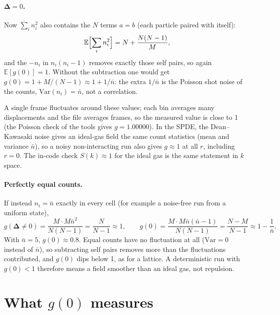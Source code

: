 \documentclass[11pt]{article}
\newcommand{\bD}{\boldsymbol{\Delta}}
\newcommand{\nb}{\bar n}
\begin{document}
\paragraph{$\bD=0$.} Now $\sum_in_i^2$ also contains the $N$ terms $a=b$
(each particle paired with itself):
\begin{equation}
  \mathbb E\Bigl[\sum_in_i^2\Bigr] = N + \frac{N(N-1)}{M} ,
\end{equation}
and the $-n_i$ in $n_i(n_i-1)$ removes exactly those self pairs, so again
$\mathbb E[g(0)]=1$. Without the subtraction one would get
$g(0)=1+M/(N-1)\approx1+1/\nb$: the extra $1/\nb$ is the Poisson shot noise of
the counts, $\mathrm{Var}(n_i)=\nb$, not a correlation.

A single frame fluctuates around these values; each bin averages many
displacements and the file averages frames, so the measured value is close to
1 (the Poisson check of the tools gives $g=1.00000$). In the SPDE, the
Dean--Kawasaki noise gives an ideal-gas field the same count statistics (mean
and variance $\nb$), so a noisy non-interacting run also gives $g\approx1$ at
all $r$, including $r=0$. The in-code check $S(k)\approx1$ for the ideal gas is
the same statement in $k$ space.

\paragraph{Perfectly equal counts.} If instead $n_i=\nb$ exactly in every cell
(for example a noise-free run from a uniform state),
\begin{equation}
  g(\bD\ne0) = \frac{M\cdot M\nb^2}{N(N-1)} = \frac{N}{N-1}\approx1,\qquad
  g(0) = \frac{M\cdot M\nb(\nb-1)}{N(N-1)} = \frac{N-M}{N-1}\approx 1-\frac1{\nb}.
\end{equation}
With $\nb=5$, $g(0)\approx0.8$. Equal counts have no fluctuation at all
($\mathrm{Var}=0$ instead of $\nb$), so subtracting self pairs removes more than
the fluctuations contributed, and $g(0)$ dips below 1, as for a lattice. A
deterministic run with $g(0)<1$ therefore means a field smoother than an ideal
gas, not repulsion.

\section{\texorpdfstring{What $g(0)$ measures}{What g(0) measures}}
\end{document}
